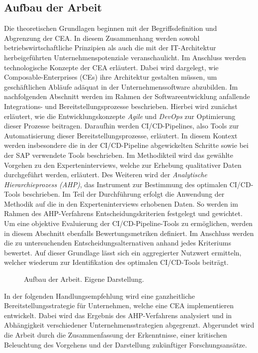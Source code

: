 \subsection{Aufbau der Arbeit}
Die theoretischen Grundlagen beginnen mit der Begriffsdefinition und Abgrenzung der CEA. In diesem Zusammenhang werden sowohl betriebswirtschaftliche Prinzipien als auch die mit der IT-Architektur herbeigeführten Unternehmenspotenziale veranschaulicht. Im Anschluss werden technologische Konzepte der CEA erläutert. Dabei wird dargelegt, wie Composable-Enterprises (\acs{CE}s) ihre Architektur gestalten müssen, um geschäftlichen Abläufe adäquat in der Unternehmenssoftware abzubilden. Im nachfolgenden Abschnitt werden im Rahmen der Softwareentwicklung anfallende Integrations- und Bereitstellungsprozesse beschrieben. Hierbei wird zunächst erläutert, wie die Entwicklungskonzepte \textit{Agile} und \textit{DevOps} zur Optimierung dieser Prozesse beitragen. Daraufhin werden CI/CD-Pipelines, also Tools zur Automatisierung dieser Bereitstellungsprozesse, erläutert. In diesem Kontext werden insbesondere die in der CI/CD-Pipeline abgewickelten Schritte sowie bei der SAP verwendete Tools beschrieben. Im Methodikteil wird das gewählte Vorgehen zu den Experteninterviews, welche zur Erhebung qualitativer Daten durchgeführt werden, erläutert. Des Weiteren wird der \textit{Analytische Hierarchieprozess (\acs{AHP})}, das Instrument zur Bestimmung des optimalen CI/CD-Tools beschrieben. Im Teil der Durchführung erfolgt die Anwendung der Methodik auf die in den Experteninterviews erhobenen Daten. So werden im Rahmen des AHP-Verfahrens Entscheidungskriterien festgelegt und gewichtet. Um eine objektive Evaluierung der CI/CD-Pipeline-Tools zu ermöglichen, werden in diesem Abschnitt ebenfalls Bewertungsmetriken definiert. Im Anschluss werden die zu untersuchenden Entscheidungsalternativen anhand jedes Kriteriums bewertet. Auf dieser Grundlage lässt sich ein aggregierter Nutzwert ermitteln, welcher wiederum zur Identifikation des optimalen CI/CD-Tools beiträgt. 
\begin{center}
	\begin{figure}[H]
		\centering
		\caption[Aufbau der Arbeit]{Aufbau der Arbeit. Eigene Darstellung.}
		\label{fig:Aufbau}
	\end{figure}	
\end{center}
\vspace*{-15mm}
In der folgenden Handlungsempfehlung wird eine ganzheitliche Bereitstellungsstrategie für Unternehmen, welche eine CEA implementieren entwickelt. Dabei wird das Ergebnis des AHP-Verfahrens analysiert und in Abhängigkeit verschiedener Unternehmensstrategien abgegrenzt. Abgerundet wird die Arbeit durch die Zusammenfassung der Erkenntnisse, einer kritischen Beleuchtung des Vorgehens und der Darstellung zukünftiger Forschungsansätze. 

